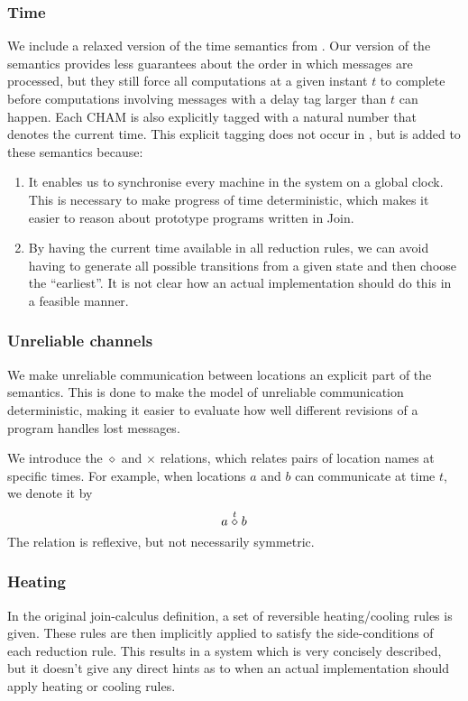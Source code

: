 \subsubsection{Time}
We include a relaxed version of the time semantics from \cite{timed-join}. Our
version of the semantics provides less guarantees about the order in which
messages are processed, but they still force all computations at a given instant
$t$ to complete before computations involving messages with a delay tag larger
than $t$ can happen. Each CHAM is also explicitly tagged with a natural number
that denotes the current time. This explicit tagging does not occur in
\cite{timed-join}, but is added to these semantics because:
\begin{enumerate}
 \item It enables us to synchronise every machine in the system on a global
 clock. This is necessary to make progress of time deterministic, which makes
 it easier to reason about prototype programs written in Join.
 \item By having the current time available in all reduction rules, we can
 avoid having to generate all possible transitions from a given state and then
 choose the ``earliest''. It is not clear how an actual implementation should
 do this in a feasible manner.
\end{enumerate}

\subsubsection{Unreliable channels}
We make unreliable communication between locations an explicit part of the
semantics. This is done to make the model of unreliable communication
deterministic, making it easier to evaluate how well different revisions of a
program handles lost messages.

We introduce the $\diamond$ and $\times$ relations, which relates pairs of
location names at specific times. For example, when locations $a$ and $b$ can
communicate at time $t$, we denote it by
\begin{equation*}
 a \stackrel{t}{\diamond} b
\end{equation*}
The relation is reflexive, but not necessarily symmetric.

\subsubsection{Heating}
In the original join-calculus definition, a set of reversible heating/cooling
rules is given. These rules are then implicitly applied to satisfy the
side-conditions of each reduction rule. This results in a system which is very
concisely described, but it doesn't give any direct hints as to when an actual
implementation should apply heating or cooling rules.


